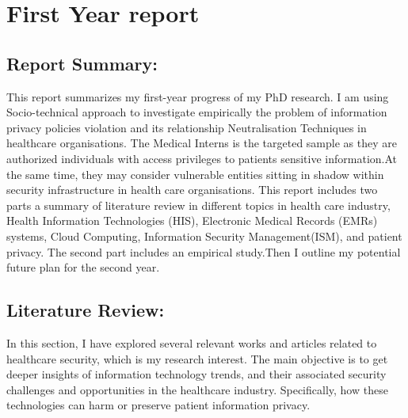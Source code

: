 


\chapter{First Year report}

\label{c:First Year}
\section{Report Summary:}
This report summarizes my first-year progress of my PhD research. I am using Socio-technical approach to  investigate empirically the problem of information privacy policies violation and its relationship Neutralisation Techniques in healthcare organisations. The Medical Interns is the targeted sample as they are authorized individuals with access privileges to patients sensitive information.At the same time, they may consider vulnerable entities sitting in shadow within security infrastructure in health care organisations. This report includes two parts a summary of literature review in different topics in health care industry, Health Information Technologies (HIS), Electronic Medical Records (EMRs) systems, Cloud Computing, Information Security Management(ISM), and patient privacy. The second part includes an empirical study.Then I outline my potential future plan for the second year.



\section{Literature Review:}
In this section, I have explored several relevant works and articles related to healthcare security, which is my research interest. The main objective is to get deeper insights of information technology trends, and their associated security challenges and opportunities in the healthcare industry. Specifically, how these technologies can harm or preserve patient information privacy.

